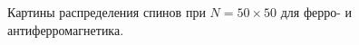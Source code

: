 \documentclass[12pt,a4paper]{article}
\begin{document}
\begin{figure}[!htb]
            \hspace{8pt}%
            \hspace{8pt}%
            \caption[]{Картины распределения спинов при $N=50\times 50$ для ферро- и антиферромагнетика.}%
            \label{fig:2}%
        \end{figure}
        \begin{figure}[!htb]%
            \centering
            \hspace{8pt}%
            \hspace{8pt}%
            \hspace{8pt}%

\end{figure}
\end{document}
